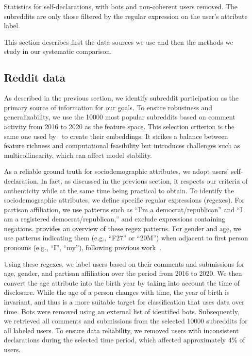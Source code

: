 \begin{table*}[t]
\caption{Statistics for self-declarations, with bots and non-coherent users removed. The subreddits are only those filtered by the regular expression on the user's attribute label.}
\centering
\resizebox{.85\textwidth}{!}{}
\label{table:stats}
\end{table*}

This section describes first the data sources we use and then the methods we study in our systematic comparison.

\subsection{Reddit data}
As described in the previous section, we identify subreddit participation as the primary source of information for our goals.
To ensure robustness and generalizability, we use the \num{10000} most popular subreddits based on comment activity from 2016 to 2020 as the feature space.
This selection criterion is the same one used by~\citet{waller2021quantifying} to create their embeddings.
It strikes a balance between feature richness and computational feasibility but introduces challenges such as multicollinearity, which can affect model stability.

As a reliable ground truth for sociodemographic attributes, we adopt users' self-declaration.
In fact, as discussed in the previous section, it respects our criteria of authenticity while at the same time being practical to obtain.
To identify the sociodemographic attributes, we define specific regular expressions (regexes).
For partisan affiliation, we use patterns such as ``I'm a democrat/republican'' and ``I am a registered democrat/republican,'' and exclude expressions containing negations.
 provides an overview of these regex patterns.
For gender and age, we use patterns indicating them (e.g., ``F27'' or ``20M'') when adjacent to first person pronouns (e.g., ``I'', ``my''), following previous work~\citep{de2022social}.

Using these regexes, we label users based on their comments and submissions for age, gender, and partisan affiliation over the period from 2016 to 2020.
We then convert the age attribute into the birth year by taking into account the time of disclosure.
While the age of a person changes with time, the year of birth is invariant, and thus is a more suitable target for classification that uses data over time.
Bots were removed using an external list of identified bots.
Subsequently, we retrieved all comments and submissions from the selected \num{10000} subreddits for all labeled users.
To ensure data reliability, we removed users with inconsistent declarations during the selected time period, which affected approximately $4\%$ of users.

